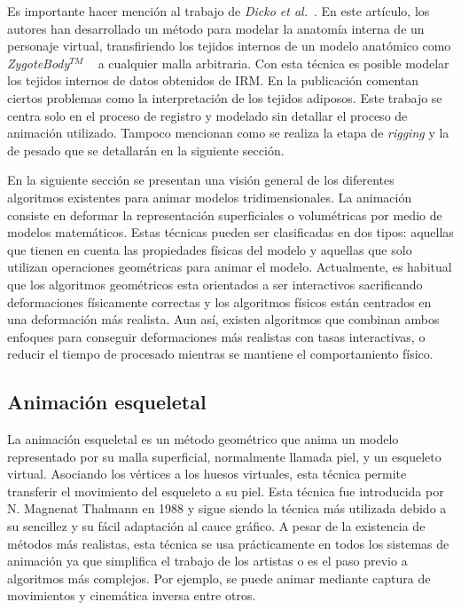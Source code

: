 Es importante hacer mención al trabajo de  \emph{Dicko et al.}~\cite{Ali2013}. En este artículo, los autores han desarrollado un método para modelar la anatomía interna de un personaje virtual, transfiriendo los tejidos internos de un modelo anatómico como \emph{ZygoteBody}$^{TM}$ ~\cite{kelc2012zygote} a cualquier malla arbitraria. Con esta técnica es posible modelar los tejidos internos de datos obtenidos de \ac{IRM}. En la publicación comentan ciertos problemas como la interpretación de los tejidos adiposos. Este trabajo se centra solo en el proceso de registro y modelado sin detallar el proceso de animación utilizado. Tampoco mencionan como se realiza la etapa de \emph{rigging} y la de pesado que se detallarán en la siguiente sección.  


En la siguiente sección se presentan una visión general de los diferentes algoritmos existentes para animar modelos tridimensionales. La animación consiste en deformar la representación superficiales  o volumétricas por medio de modelos matemáticos. Estas técnicas pueden ser clasificadas en dos tipos: aquellas que tienen en cuenta las propiedades físicas del modelo y aquellas que solo utilizan operaciones geométricas para animar el modelo. Actualmente, es habitual que los algoritmos geométricos esta orientados a ser interactivos sacrificando deformaciones físicamente correctas y los algoritmos físicos están centrados en una deformación más realista. Aun así, existen algoritmos que combinan ambos enfoques para conseguir deformaciones más realistas con tasas interactivas, o reducir el tiempo de procesado mientras se mantiene el comportamiento físico. 


\subsection{Animación esqueletal}
\label{art:animation}
\label{art:virtualskel}

La animación esqueletal es un método geométrico que anima un modelo representado por su malla superficial, normalmente llamada piel, y un esqueleto virtual. Asociando los vértices a los huesos virtuales, esta técnica permite transferir el movimiento del esqueleto a su piel. Esta técnica fue introducida por N. Magnenat Thalmann en 1988 \cite{thalmann88} y sigue siendo la técnica más utilizada debido a su sencillez y su fácil adaptación al cauce gráfico. A pesar de la existencia de métodos más realistas, esta técnica se usa prácticamente en todos los sistemas de animación ya que simplifica el trabajo de los artistas o es el paso previo a algoritmos más complejos. Por ejemplo, se puede animar mediante captura de movimientos y cinemática inversa entre otros.

